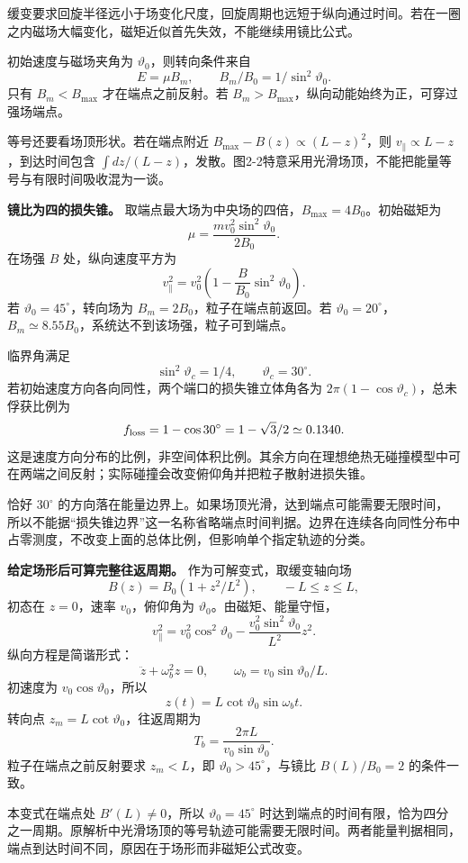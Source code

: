 \documentclass[12pt,a4paper,UTF8]{ctexart}
\begin{document}
缓变要求回旋半径远小于场变化尺度，回旋周期也远短于纵向通过时间。若在一圈之内磁场大幅变化，磁矩近似首先失效，不能继续用镜比公式。

初始速度与磁场夹角为 \(\vartheta_0\)，则转向条件来自 \[
E=\mu B_m,\qquad B_m/B_0=1/\sin^2\vartheta_0.
\] 只有 \(B_m<B_{\max}\) 才在端点之前反射。若
\(B_m>B_{\max}\)，纵向动能始终为正，可穿过强场端点。

等号还要看场顶形状。若在端点附近 \(B_{\max}-B(z)\propto(L-z)^2\)，则
\(v_\parallel\propto L-z\)，到达时间包含
\(\int dz/(L-z)\)，发散。图2-2特意采用光滑场顶，不能把能量等号与有限时间吸收混为一谈。

\textbf{镜比为四的损失锥。}
取端点最大场为中央场的四倍，\(B_{\max}=4B_0\)。初始磁矩为 \[
\mu=\frac{mv_0^2\sin^2\vartheta_0}{2B_0}.
\] 在场强 \(B\) 处，纵向速度平方为 \[
v_\parallel^2=v_0^2\left(1-\frac B{B_0}\sin^2\vartheta_0\right).
\] 若 \(\vartheta_0=45^\circ\)，转向场为
\(B_m=2B_0\)，粒子在端点前返回。若
\(\vartheta_0=20^\circ\)，\(B_m\simeq8.55B_0\)，系统达不到该场强，粒子可到端点。

临界角满足 \[
\sin^2\vartheta_c=1/4,\qquad\vartheta_c=30^\circ.
\] 若初始速度方向各向同性，两个端口的损失锥立体角各为
\(2\pi(1-\cos\vartheta_c)\)，总未俘获比例为 \[
f_{\rm loss}=1-\cos30^\circ=1-\sqrt3/2\simeq0.1340.
\]
这是速度方向分布的比例，非空间体积比例。其余方向在理想绝热无碰撞模型中可在两端之间反射；实际碰撞会改变俯仰角并把粒子散射进损失锥。

恰好 \(30^\circ\)
的方向落在能量边界上。如果场顶光滑，达到端点可能需要无限时间，所以不能据``损失锥边界''这一名称省略端点时间判据。边界在连续各向同性分布中占零测度，不改变上面的总体比例，但影响单个指定轨迹的分类。

\textbf{给定场形后可算完整往返周期。} 作为可解变式，取缓变轴向场 \[
B(z)=B_0(1+z^2/L^2),\qquad -L\le z\le L,
\] 初态在 \(z=0\)，速率 \(v_0\)，俯仰角为
\(\vartheta_0\)。由磁矩、能量守恒， \[
v_\parallel^2=v_0^2\cos^2\vartheta_0-
\frac{v_0^2\sin^2\vartheta_0}{L^2}z^2.
\] 纵向方程是简谐形式： \[
\ddot z+\omega_b^2z=0,
\qquad\omega_b=v_0\sin\vartheta_0/L.
\] 初速度为 \(v_0\cos\vartheta_0\)，所以 \[
z(t)=L\cot\vartheta_0\sin\omega_bt.
\] 转向点 \(z_m=L\cot\vartheta_0\)，往返周期为 \[
T_b=\frac{2\pi L}{v_0\sin\vartheta_0}.
\] 粒子在端点之前反射要求 \(z_m<L\)，即 \(\vartheta_0>45^\circ\)，与镜比
\(B(L)/B_0=2\) 的条件一致。

本变式在端点处 \(B'(L)\ne0\)，所以 \(\vartheta_0=45^\circ\)
时达到端点的时间有限，恰为四分之一周期。原解析中光滑场顶的等号轨迹可能需要无限时间。两者能量判据相同，端点到达时间不同，原因在于场形而非磁矩公式改变。
\end{document}
